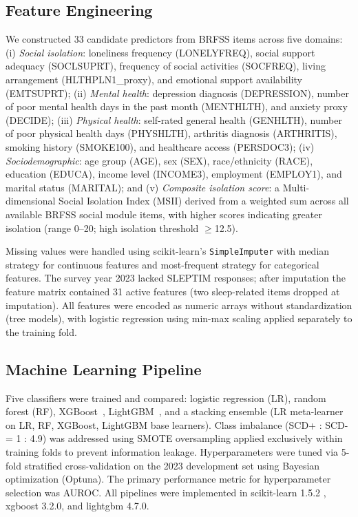\documentclass[12pt,a4paper]{article}
\begin{document}
\subsection{Feature Engineering}

We constructed 33 candidate predictors from BRFSS items across five domains:
(i) \textit{Social isolation}: loneliness frequency (LONELYFREQ), social
support adequacy (SOCLSUPRT), frequency of social activities (SOCFREQ), living
arrangement (HLTHPLN1\_proxy), and emotional support availability (EMTSUPRT);
(ii) \textit{Mental health}: depression diagnosis (DEPRESSION), number of
poor mental health days in the past month (MENTHLTH), and anxiety proxy
(DECIDE); (iii) \textit{Physical health}: self-rated general health (GENHLTH),
number of poor physical health days (PHYSHLTH), arthritis diagnosis (ARTHRITIS),
smoking history (SMOKE100), and healthcare access (PERSDOC3);
(iv) \textit{Sociodemographic}: age group (AGE), sex (SEX), race/ethnicity
(RACE), education (EDUCA), income level (INCOME3), employment (EMPLOY1),
and marital status (MARITAL); and (v) \textit{Composite isolation score}: a
Multi-dimensional Social Isolation Index (MSII) derived from a weighted sum
across all available BRFSS social module items, with higher scores indicating
greater isolation (range 0--20; high isolation threshold $\geq$12.5).

Missing values were handled using scikit-learn's \texttt{SimpleImputer} with
median strategy for continuous features and most-frequent strategy for
categorical features. The survey year 2023 lacked SLEPTIM responses; after
imputation the feature matrix contained 31 active features (two sleep-related
items dropped at imputation). All features were encoded as numeric arrays
without standardization (tree models), with logistic regression using
min-max scaling applied separately to the training fold.

\subsection{Machine Learning Pipeline}

Five classifiers were trained and compared: logistic regression (LR),
random forest (RF), XGBoost~\cite{ChenGuestrin2016}, LightGBM~\cite{Ke2017},
and a stacking ensemble (LR meta-learner on LR, RF, XGBoost, LightGBM base
learners). Class imbalance (SCD+ : SCD- = 1 : 4.9) was addressed using
SMOTE oversampling applied exclusively within training folds to prevent
information leakage. Hyperparameters were tuned via 5-fold stratified
cross-validation on the 2023 development set using Bayesian optimization
(Optuna). The primary performance metric for hyperparameter selection was AUROC.
All pipelines were implemented in scikit-learn 1.5.2 \cite{Pedregosa2011},
xgboost 3.2.0, and lightgbm 4.7.0.
\end{document}
